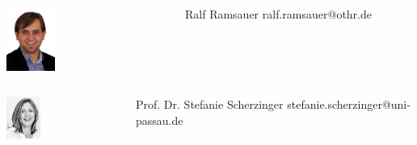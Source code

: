 \documentclass{beamer}
\begin{document}
\begin{frame}
\begin{minipage}[c]{1.0\linewidth}
	\end{minipage}
	\begin{minipage}[c]{1.0\linewidth}
		\begin{columns}
		\begin{column}{0.35\textwidth}
			\begin{center}
     		\includegraphics[width=0.3\textwidth]{pics/speakers_ralf.png}
			\end{center}
		\end{column}
		\begin{column}{0.7\textwidth}
		\begin{block}{Ralf Ramsauer}
			ralf.ramsauer@othr.de
		\end{block}
		\end{column}
		\end{columns}
	\end{minipage}
	\begin{minipage}[c]{1.0\linewidth}
		\begin{columns}
		\begin{column}{0.35\textwidth}
			\begin{center}
     		\includegraphics[width=0.3\textwidth]{pics/speakers_scherzinger.jpeg}
			\end{center}
		\end{column}
		\begin{column}{0.7\textwidth}
		\begin{block}{Prof. Dr. Stefanie Scherzinger}
			stefanie.scherzinger@uni-passau.de
		\end{block}
		\end{column}
		\end{columns}
	\end{minipage}
	\end{frame}
\end{document}
